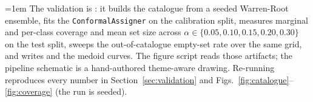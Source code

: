 \documentclass[journal]{IEEEtran}
\begin{document}
{\raggedright\parindent=1em
The validation is : it builds the
catalogue from a seeded Warren-Root ensemble, fits the \texttt{ConformalAssigner} on the calibration split,
measures marginal and per-class coverage and mean set size across $\alpha\in\{0.05,0.10,0.15,0.20,0.30\}$ on the
test split, sweeps the out-of-catalogue empty-set rate over the same grid, and writes
 and the medoid curves. The figure script reads those artifacts; the
pipeline schematic is a hand-authored theme-aware drawing. Re-running reproduces every number in
Section~\ref{sec:validation} and Figs.~\ref{fig:catalogue}--\ref{fig:coverage} (the run is seeded).\par}

\balance
\end{document}
